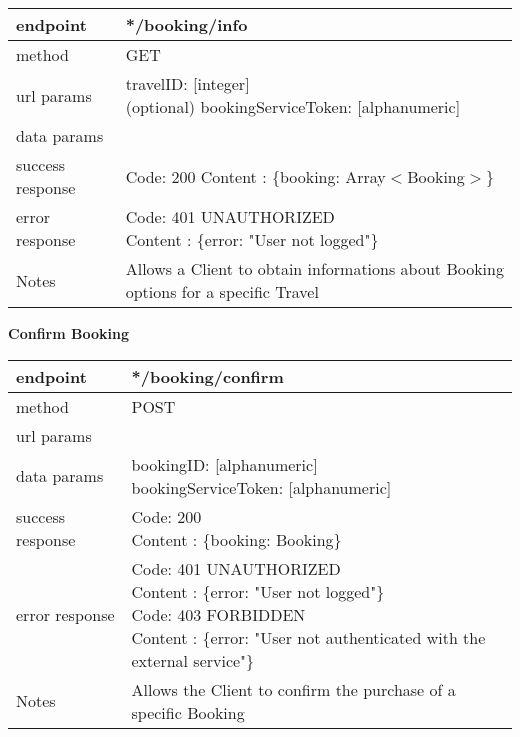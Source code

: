 \begin{tabularx}{\linewidth}{| l | l |}
	\hline
	endpoint & */booking/info \\
	\hline
	method & GET \\
	\hline
	url params & 
	\parbox{0.7\textwidth}{
		\bigskip
		travelID: [integer] \\
		(optional) bookingServiceToken: [alphanumeric]
		\bigskip
	} \\
	\hline
	data params & \\
	\hline
	success response &
	\parbox{0.7\textwidth}{
		\bigskip
		Code: 200\\
		Content : \{booking: Array$<$Booking$>$\}
		\bigskip
	} \\
	\hline
	error response &
	\parbox{0.7\textwidth}{
		\bigskip
		Code: 401 UNAUTHORIZED \\
		Content : \{error: "User not logged"\}
		\bigskip
	} \\
	\hline
	Notes & \parbox{0.7\textwidth}{
	\bigskip
	Allows a Client to obtain informations about Booking options for a specific Travel
	\bigskip
	}\\
	\hline
\end{tabularx}
\newpage

\textbf{Confirm Booking}

\begin{tabularx}{\linewidth}{| l | l |}
	\hline
	endpoint & */booking/confirm \\
	\hline
	method & POST \\
	\hline
	url params & \\
	\hline
	data params & 
	\parbox{0.7\textwidth}{
		\bigskip
		bookingID: [alphanumeric] \\
		bookingServiceToken: [alphanumeric]
		\bigskip
	} 
	\\
	\hline
	success response &
	\parbox{0.7\textwidth}{
		\bigskip
		Code: 200\\
		Content : \{booking: Booking\}
		\bigskip
	} \\
	\hline
	error response &
	\parbox{0.7\textwidth}{
		\bigskip
		Code: 401 UNAUTHORIZED \\
		Content : \{error: "User not logged"\}\\
		Code: 403 FORBIDDEN \\
		Content : \{error: "User not authenticated with the external service"\}
		\bigskip
	} \\
	\hline
	Notes & \parbox{0.7\textwidth}{
		\bigskip
		Allows the Client to confirm the purchase of a specific Booking
		\bigskip
	} \\
	\hline
\end{tabularx}

